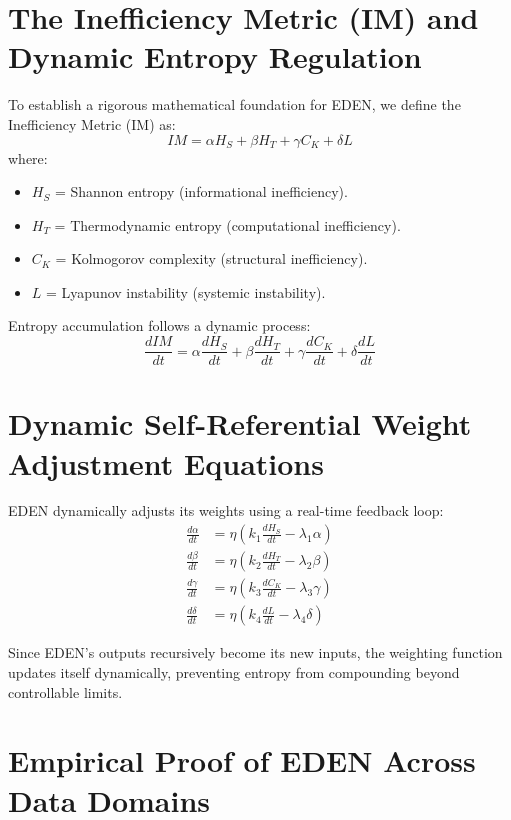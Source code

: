 \documentclass{article}
\begin{document}
\section{The Inefficiency Metric (IM) and Dynamic Entropy Regulation}

To establish a rigorous mathematical foundation for EDEN, we define the Inefficiency Metric (IM) as:
\begin{equation}
IM = \alpha H_S + \beta H_T + \gamma C_K + \delta L
\end{equation}
where:
\begin{itemize}
    \item $H_S$ = Shannon entropy (informational inefficiency).
    \item $H_T$ = Thermodynamic entropy (computational inefficiency).
    \item $C_K$ = Kolmogorov complexity (structural inefficiency).
    \item $L$ = Lyapunov instability (systemic instability).
\end{itemize}

Entropy accumulation follows a dynamic process:
\begin{equation}
\frac{dIM}{dt} = \alpha \frac{dH_S}{dt} + \beta \frac{dH_T}{dt} + \gamma \frac{dC_K}{dt} + \delta \frac{dL}{dt}
\end{equation}

\section{Dynamic Self-Referential Weight Adjustment Equations}

EDEN dynamically adjusts its weights using a real-time feedback loop:
\begin{align}
\frac{d\alpha}{dt} &= \eta \left( k_1 \frac{dH_S}{dt} - \lambda_1 \alpha \right) \\
\frac{d\beta}{dt} &= \eta \left( k_2 \frac{dH_T}{dt} - \lambda_2 \beta \right) \\
\frac{d\gamma}{dt} &= \eta \left( k_3 \frac{dC_K}{dt} - \lambda_3 \gamma \right) \\
\frac{d\delta}{dt} &= \eta \left( k_4 \frac{dL}{dt} - \lambda_4 \delta \right)
\end{align}

Since EDEN’s outputs recursively become its new inputs, the weighting function updates itself dynamically, preventing entropy from compounding beyond controllable limits.

\section{Empirical Proof of EDEN Across Data Domains}
\end{document}
